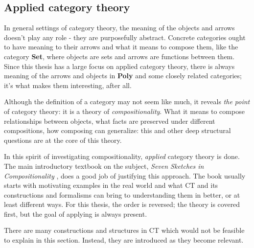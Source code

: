 
\subsection{Applied category theory}
In general settings of category theory, the meaning of the objects and arrows doesn't play any role - they are purposefully abstract. Concrete categories ought to have meaning to their arrows and what it means to compose them, like the category \textbf{Set}, where objects are sets and arrows are functions between them. Since this thesis has a large focus on applied category theory, there is always meaning of the arrows and objects in \textbf{Poly} and some closely related categories; it's what makes them interesting, after all.

Although the definition of a category may not seem like much, it reveals \textit{the point} of category theory: it is a theory of \textit{compositionality}. What it means to compose relationships between objects, what facts are preserved under different compositions, how composing can generalize: this and other deep structural questions are at the core of this theory. 

In this spirit of investigating compositionality, \textit{applied} category theory is done. The main introductory textbook on the subject, \textit{Seven Sketches in Compositionality} \cite{seven-sketches}, does a good job of justifying this approach. The book usually starts with motivating examples in the real world and what CT and its constructions and formalisms can bring to understanding them in better, or at least different ways. For this thesis, the order is reversed; the theory is covered first, but the goal of applying is always present.

There are many constructions and structures in CT which would not be feasible to explain in this section. Instead, they are introduced as they become relevant.






